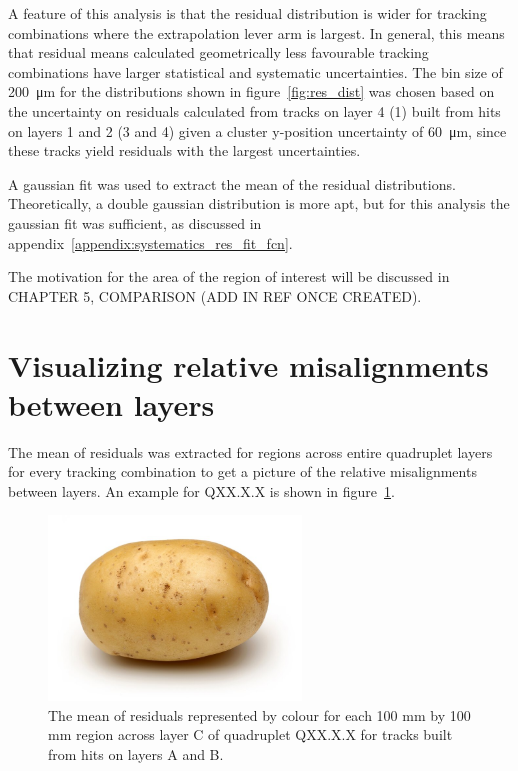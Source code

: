 A feature of this analysis is that the residual distribution is wider for tracking combinations where the extrapolation lever arm is largest. In general, this means that residual means calculated geometrically less favourable tracking combinations have larger statistical and systematic uncertainties. The bin size of \SI{200}{\micro\meter} for the distributions shown in figure~\ref{fig:res_dist} was chosen based on the uncertainty on residuals calculated from tracks on layer 4 (1) built from hits on layers 1 and 2 (3 and 4) given a cluster y-position uncertainty of \SI{60}{\micro\meter}, since these tracks yield residuals with the largest uncertainties.

A gaussian fit was used to extract the mean of the residual distributions. Theoretically, a double gaussian distribution is more apt, but for this analysis the gaussian fit was sufficient, as discussed in appendix~\ref{appendix:systematics_res_fit_fcn}.

The motivation for the area of the region of interest will be discussed in CHAPTER 5, COMPARISON (ADD IN REF ONCE CREATED).

\section{Visualizing relative misalignments between layers}

The mean of residuals was extracted for regions across entire quadruplet layers for every tracking combination to get a picture of the relative misalignments between layers. An example for QXX.X.X is shown in figure~\ref{fig:res_mean_th2}.

\begin{figure}
    \centering
    \includegraphics[width = 0.6\textwidth]{figures/potato.jpg}
    \caption{The mean of residuals represented by colour for each 100 mm by 100 mm region across layer C of quadruplet QXX.X.X for tracks built from hits on layers A and B.}
    \label{fig:res_mean_th2}
\end{figure}


